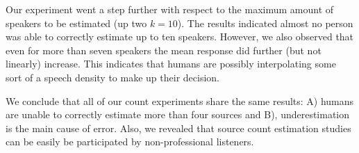 Our experiment went a step further with respect to the maximum amount of speakers to be estimated (up two \(k=10\)).
The results indicated almost no person was able to correctly estimate up to ten speakers.
However, we also observed that even for more than seven speakers the mean response did further (but not linearly) increase.
This indicates that humans are possibly interpolating some sort of a speech density to make up their decision.
\par
We conclude that all of our count experiments share the same results: A) humans are unable to correctly estimate more than four sources and B), underestimation is the main cause of error.
Also, we revealed that source count estimation studies can be easily be participated by non-professional listeners.